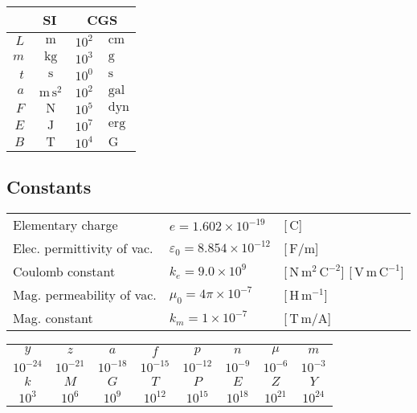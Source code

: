 \documentclass{form}
\newcommand{\expnumber}[2]{{#1}\times 10^{#2}} %
\newcommand{\unit}[1]{\ensuremath{\, \mathrm{#1}}}
\begin{document}
\begin{minipage}[c]{0.74\textwidth}
	\begin{minipage}[c]{0.31\textwidth}
		\begin{center}
			\begin{tabular}{r | c | r l} \hline \hline
		       	 	& \textbf{SI}     & \multicolumn{2}{c}{\textbf{CGS}} \\ \hline
				$L$ & $\unit{m     }$ & $10^2$&$\unit{cm }$ \\
				$m$ & $\unit{kg    }$ & $10^3$&$\unit{g  }$ \\
				$t$ & $\unit{s     }$ & $10^0$&$\unit{s  }$ \\
				$a$ & $\unit{m\,s^2}$ & $10^2$&$\unit{gal}$ \\
				$F$ & $\unit{N     }$ & $10^5$&$\unit{dyn}$ \\
				$E$ & $\unit{J     }$ & $10^7$&$\unit{erg}$ \\
				$B$ & $\unit{T     }$ & $10^4$&$\unit{G  }$ \\ \hline \hline
			\end{tabular}
		\end{center}
	\end{minipage}%
	\begin{minipage}[c]{0.69\textwidth}
		\begin{center}
			\section*{Constants}
			\begin{tabular}{ l l p{20mm} }
				Elementary charge & $e = \expnumber{1.602}{-19}$ & [$\unit{C}$]\\
				Elec. permittivity of vac. & $\varepsilon_0=\expnumber{8.854}{-12}$ & [$\unit{F/m}$] \\
				Coulomb constant & $k_e=\expnumber{9.0}{9}$ & [$\unit{N \, m^2 \, C^{-2}}$] [$\unit{V\,m\,C^{-1}}$]\\
				Mag. permeability of vac. & $\mu_0=\expnumber{4\pi}{-7}$ & [$\unit{H\,m^{-1}}$] \\
				Mag. constant & $k_m=\expnumber{1}{-7}$ & [$\unit{T\,m/A}$]
			\end{tabular}
		\end{center}
	\end{minipage}
	\begin{center}
		\begin{tabular}{c | c | c | c | c | c | c | c}
			$y$ & $z$ & $a$ & $f$ & $p$ & $n$ & $\mu$ & $m$ \\
			$10^{-24}$ &$10^{-21}$ &$10^{-18}$ & $10^{-15}$ & $10^{-12}$ & $10^{-9}$ & $10^{-6}$ & $10^{-3}$ \\ \hline \hline
			$k$ & $M$ & $G$ & $T$ & $P$ & $E$ & $Z$ & $Y$ \\
			$10^{3}$ &$10^{6}$ &$10^{9}$ &$10^{12}$ & $10^{15}$ &$10^{18}$ &$10^{21}$ &$10^{24}$
		\end{tabular}
	\end{center}
\end{minipage}\\ \\ \\
\end{document}
